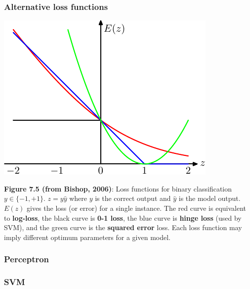 \documentclass[ignorenonframetext,plain]{beamer}
\begin{document}
\begin{frame}\frametitle{Alternative loss functions}
\begin{center}
\includegraphics[height=.5\textheight]{images/bishop-fig-7-5.pdf}
\end{center}\footnotesize
{\bf Figure 7.5 (from Bishop, 2006)}: Loss functions for binary
classification $y\in\{-1,+1\}$.  $z=y\hat{y}$ where $y$ is the correct
output and $\hat{y}$ is the model output.  $E(z)$ gives the loss (or
error) for a single instance.  The red curve is equivalent to {\bf
  log-loss}, the black curve is {\bf 0-1 loss}, the blue curve is {\bf
  hinge loss} (used by SVM), and the green curve is the {\bf squared
  error} loss.  Each loss function may imply different optimum
parameters for a given model.
\end{frame}

\begin{frame}\frametitle{Perceptron} %

\end{frame}

\begin{frame}\frametitle{SVM} %

\end{frame}
\end{document}
